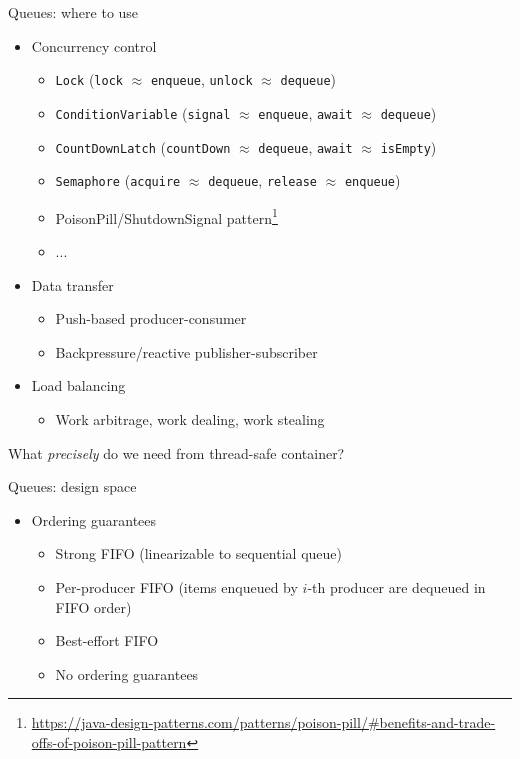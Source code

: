 \begin{frame}[fragile]{Queues: where to use}

\begin{itemize}
  \item Concurrency control
  \begin{itemize}
    \pause \item \texttt{Lock} (\texttt{lock} $\approx$ \texttt{enqueue}, \texttt{unlock} $\approx$ \texttt{dequeue})
    \pause \item \texttt{ConditionVariable} (\texttt{signal} $\approx$ \texttt{enqueue}, \texttt{await} $\approx$ \texttt{dequeue})
    \pause \item \texttt{CountDownLatch} (\texttt{countDown} $\approx$ \texttt{dequeue}, \texttt{await} $\approx$ \texttt{isEmpty})
    \pause \item \texttt{Semaphore} (\texttt{acquire} $\approx$ \texttt{dequeue}, \texttt{release} $\approx$ \texttt{enqueue})
    \pause \item PoisonPill/ShutdownSignal pattern\footnote<6->{\tiny\url{https://java-design-patterns.com/patterns/poison-pill/#benefits-and-trade-offs-of-poison-pill-pattern}}
    \pause \item ...
  \end{itemize}

  \pause
  \item Data transfer
  \begin{itemize}
    \pause \item Push-based producer-consumer
    \pause \item Backpressure/reactive publisher-subscriber
  \end{itemize}  
  
  \pause
  \item Load balancing
  \begin{itemize}
    \pause \item Work arbitrage, work dealing, work stealing
  \end{itemize}  
\end{itemize}

\pause
What \textit{precisely} do we need from thread-safe container?

\end{frame}

\begin{frame}[t,fragile]{Queues: design space}

\begin{itemize}
  \pause \item Ordering guarantees
  \begin{itemize}
    \pause \item Strong FIFO \pause (linearizable to sequential queue)
    \pause \item Per-producer FIFO \pause (items enqueued by $i$-th producer are dequeued in FIFO order)
    \pause \item Best-effort FIFO
    \pause \item No ordering guarantees 
  \end{itemize}
\end{itemize}
\end{frame}

